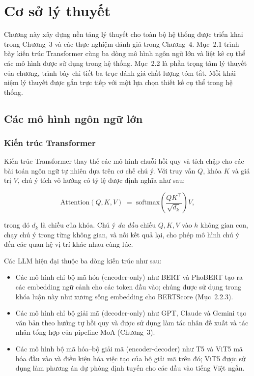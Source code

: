 \chapter{Cơ sở lý thuyết}

Chương này xây dựng nền tảng lý thuyết cho toàn bộ hệ thống được triển khai trong Chương~3 và các thực nghiệm đánh giá trong Chương~4. Mục~2.1 trình bày kiến trúc Transformer cùng ba dòng mô hình ngôn ngữ lớn
và liệt kê cụ thể các mô hình được sử dụng trong hệ thống. 
Mục~2.2 là phần trọng tâm lý thuyết của chương, trình bày chi tiết ba trục đánh giá chất lượng tóm tắt.
 Mỗi khái niệm lý thuyết được gắn trực tiếp với một lựa chọn thiết kế cụ thể trong hệ thống.

\section{Các mô hình ngôn ngữ lớn}

\subsection{Kiến trúc Transformer}

Kiến trúc Transformer \cite{Vaswani2017} thay thế các mô hình chuỗi hồi quy và tích chập cho các bài toán ngôn ngữ tự nhiên dựa trên cơ chế chú ý. Với truy vấn $Q$, khóa $K$ và giá trị $V$, chú ý tích vô hướng có tỷ lệ được định nghĩa như sau:

\[
\text{Attention}(Q,K,V) \;=\; \text{softmax}\!\left(\frac{QK^{\top}}{\sqrt{d_k}}\right) V,
\]

\noindent trong đó $d_k$ là chiều của khóa. Chú ý \textit{đa đầu} chiếu $Q, K, V$ vào $h$ không gian con, chạy chú ý trong từng không gian, và nối kết quả lại, cho phép mô hình chú ý đến các quan hệ vị trí khác nhau cùng lúc.

Các LLM hiện đại thuộc ba dòng kiến trúc như sau: 
\begin{itemize}
  \item Các mô hình chỉ bộ mã hóa (encoder-only) như BERT và PhoBERT \cite{Nguyen2020} tạo ra các embedding ngữ cảnh cho các token đầu vào; chúng được sử dụng trong khóa luận này như xương sống embedding cho BERTScore (Mục~2.2.3).
  \item Các mô hình chỉ bộ giải mã (decoder-only) như GPT, Claude và Gemini tạo văn bản theo hướng tự hồi quy và được sử dụng làm tác nhân đề xuất và tác nhân tổng hợp của pipeline MoA (Chương~3).
  \item Các mô hình bộ mã hóa--bộ giải mã (encoder-decoder) như T5 và ViT5 \cite{Nguyen2022} mã hóa đầu vào và điều kiện hóa việc tạo của bộ giải mã trên đó; ViT5 được sử dụng làm phương án dự phòng định tuyến cho các đầu vào tiếng Việt ngắn.
\end{itemize}

